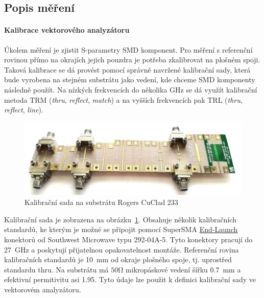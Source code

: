 \documentclass[11pt,a4paper]{article}
\newcommand{\Ohm}{\mathrm{\Omega}}
\begin{document}
\subsection*{Popis měření}

\paragraph*{Kalibrace vektorového analyzátoru} Úkolem měření je zjistit S-parametry SMD komponent. Pro měření s referenční rovinou přímo na okrajích jejich pouzdra je potřeba zkalibrovat na plošném spoji. Taková kalibrace se dá provést pomocí správně navržené kalibrační sady, která bude vyrobena na stejném substrátu jako vedení, kde chceme SMD komponenty následně použít. Na nízkých frekvencích do několika GHz se dá využít kalibrační metoda TRM (\emph{thru}, \emph{reflect}, \emph{match}) a na vyšších frekvencích pak TRL (\emph{thru}, \emph{reflect}, \emph{line}).
\begin{figure}[!ht]
    \centering
    \includegraphics[width=.7\textwidth]{src/kalibracni-sada.png}
    \caption{\label{fig:kalibracni-sada}Kalibrační sada na substrátu Rogers CuClad 233}
\end{figure}

Kalibrační sada je zobrazena na obrázku~\ref{fig:kalibracni-sada}. Obsahuje několik kalibračních standardů, ke kterým je možné se připojit pomocí SuperSMA \href{https://mpd.southwestmicrowave.com/product-category/end-launch-connectors/}{End-Launch} konektorů od Southwest Microwave typu 292-04A-5. Tyto konektory pracují do 27~GHz a poskytují přijatelnou opakovatelnost montáže. Referenční rovina kalibračních standardů je 10~mm od okraje plošného spoje, tj. uprostřed standardu thru. Na substrátu má $50\Ohm$ mikropáskové vedení šířku 0.7~mm a efektivní permitivitu asi 1.95. Tyto údaje lze použit k definici kalibrační sady ve vektorovém analyzátoru.
\end{document}
